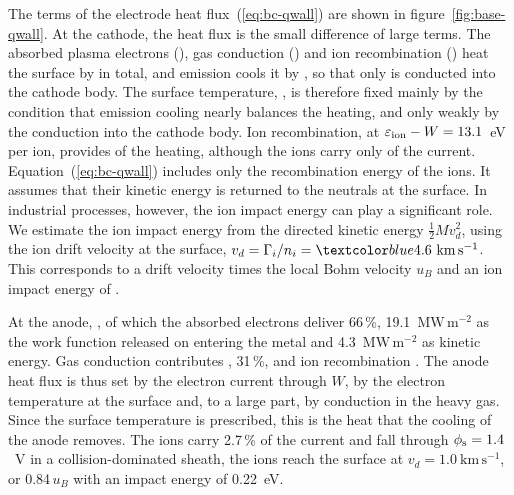 The terms of the electrode heat flux~(\ref{eq:bc-qwall}) are shown in figure~\ref{fig:base-qwall}. At the cathode, the heat flux is the small difference of large terms. The absorbed plasma electrons (), gas conduction () and ion recombination () heat the surface by  in total, and emission cools it by , so that only  is conducted into the cathode body. The surface temperature, , is therefore fixed mainly by the condition that emission cooling nearly balances the heating, and only weakly by the conduction into the cathode body. Ion recombination, at \(\varepsilon_{\rm ion}-W=13.1\)~eV per ion, provides  of the heating, although the ions carry only  of the current. Equation~(\ref{eq:bc-qwall}) includes only the recombination energy of the ions. It assumes that their kinetic energy is returned to the neutrals at the surface. In industrial processes, however, the ion impact energy can play a significant role. We estimate the ion impact energy from the directed kinetic energy \(\tfrac12Mv_d^2\), using the ion drift velocity at the surface, \(v_d=\Gamma_i/n_i=\rev{4.6}\ \mathrm{km\,s^{-1}}\). This corresponds to a drift velocity  times the local Bohm velocity \(u_B\) and an ion impact energy of .


At the anode, , of which the absorbed electrons deliver 66\,\%, 19.1~\(\mathrm{MW\,m^{-2}}\) as the work function released on entering the metal and 4.3~\(\mathrm{MW\,m^{-2}}\) as kinetic energy. Gas conduction contributes , 31\,\%, and ion recombination . The anode heat flux is thus set by the electron current through \(W\), by the electron temperature at the surface and, to a large part, by conduction in the heavy gas. Since the surface temperature is prescribed, this is the heat that the cooling of the anode removes. The ions carry 2.7\,\% of the current and fall through \(\phi_{\rm s}=1.4\)~V in a collision-dominated sheath, the ions reach the surface at \(v_d=1.0\ \mathrm{km\,s^{-1}}\), or 0.84\,\(u_B\) with an impact energy of 0.22~eV.

